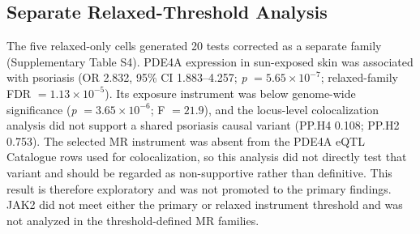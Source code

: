 \subsection*{Separate Relaxed-Threshold Analysis}

The five relaxed-only cells generated 20 tests corrected as a separate family (Supplementary Table S4). PDE4A expression in sun-exposed skin was associated with psoriasis (OR 2.832, 95\% CI 1.883--4.257; \textit{p} $=5.65\times10^{-7}$; relaxed-family FDR $=1.13\times10^{-5}$). Its exposure instrument was below genome-wide significance (\textit{p} $=3.65\times10^{-6}$; F $=21.9$), and the locus-level colocalization analysis did not support a shared psoriasis causal variant (PP.H4 0.108; PP.H2 0.753). The selected MR instrument was absent from the PDE4A eQTL Catalogue rows used for colocalization, so this analysis did not directly test that variant and should be regarded as non-supportive rather than definitive. This result is therefore exploratory and was not promoted to the primary findings. JAK2 did not meet either the primary or relaxed instrument threshold and was not analyzed in the threshold-defined MR families.
